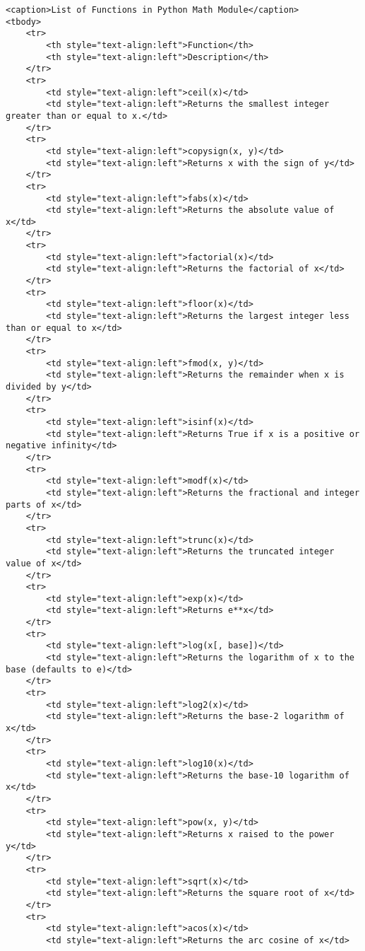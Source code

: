 \documentclass[11pt]{article}
\begin{document}
    \begin{verbatim}
<caption>List of Functions in Python Math Module</caption>
<tbody>
    <tr>
        <th style="text-align:left">Function</th>
        <th style="text-align:left">Description</th>
    </tr>
    <tr>
        <td style="text-align:left">ceil(x)</td>
        <td style="text-align:left">Returns the smallest integer greater than or equal to x.</td>
    </tr>
    <tr>
        <td style="text-align:left">copysign(x, y)</td>
        <td style="text-align:left">Returns x with the sign of y</td>
    </tr>
    <tr>
        <td style="text-align:left">fabs(x)</td>
        <td style="text-align:left">Returns the absolute value of x</td>
    </tr>
    <tr>
        <td style="text-align:left">factorial(x)</td>
        <td style="text-align:left">Returns the factorial of x</td>
    </tr>
    <tr>
        <td style="text-align:left">floor(x)</td>
        <td style="text-align:left">Returns the largest integer less than or equal to x</td>
    </tr>
    <tr>
        <td style="text-align:left">fmod(x, y)</td>
        <td style="text-align:left">Returns the remainder when x is divided by y</td>
    </tr>
    <tr>
        <td style="text-align:left">isinf(x)</td>
        <td style="text-align:left">Returns True if x is a positive or negative infinity</td>
    </tr>
    <tr>
        <td style="text-align:left">modf(x)</td>
        <td style="text-align:left">Returns the fractional and integer parts of x</td>
    </tr>
    <tr>
        <td style="text-align:left">trunc(x)</td>
        <td style="text-align:left">Returns the truncated integer value of x</td>
    </tr>
    <tr>
        <td style="text-align:left">exp(x)</td>
        <td style="text-align:left">Returns e**x</td>
    </tr>
    <tr>
        <td style="text-align:left">log(x[, base])</td>
        <td style="text-align:left">Returns the logarithm of x to the base (defaults to e)</td>
    </tr>
    <tr>
        <td style="text-align:left">log2(x)</td>
        <td style="text-align:left">Returns the base-2 logarithm of x</td>
    </tr>
    <tr>
        <td style="text-align:left">log10(x)</td>
        <td style="text-align:left">Returns the base-10 logarithm of x</td>
    </tr>
    <tr>
        <td style="text-align:left">pow(x, y)</td>
        <td style="text-align:left">Returns x raised to the power y</td>
    </tr>
    <tr>
        <td style="text-align:left">sqrt(x)</td>
        <td style="text-align:left">Returns the square root of x</td>
    </tr>
    <tr>
        <td style="text-align:left">acos(x)</td>
        <td style="text-align:left">Returns the arc cosine of x</td>

\end{verbatim}
\end{document}
